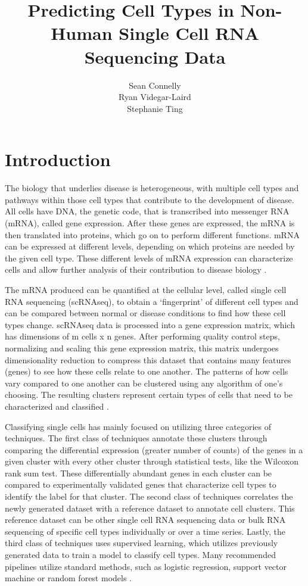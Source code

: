 \documentclass{article}
\title{Predicting Cell Types in Non-Human Single Cell RNA Sequencing Data}
\author{
  Sean Connelly \\
  \And
  Ryan Videgar-Laird \\
  \AND
  Stephanie Ting \\
}
\begin{document}
\maketitle

\section{Introduction}

The biology that underlies disease is heterogeneous, with multiple cell types and pathways within those cell types that contribute to the development of disease. All cells have DNA, the genetic code, that is transcribed into messenger RNA (mRNA), called gene expression. After these genes are expressed, the mRNA is then translated into proteins, which go on to perform different functions. mRNA can be expressed at different levels, depending on which proteins are needed by the given cell type. These different levels of mRNA expression can characterize cells and allow further analysis of their contribution to disease biology \cite{segundo-valIntroductionGeneExpression2016}.
 
 The mRNA produced can be quantified at the cellular level, called single cell RNA sequencing (scRNAseq), to obtain a ‘fingerprint’ of different cell types and can be compared between normal or disease conditions to find how these cell types change. scRNAseq data is processed into a gene expression matrix, which has dimensions of m cells x n genes. After performing quality control steps, normalizing and scaling this gene expression matrix, this matrix undergoes dimensionality reduction to compress this dataset that contains many features (genes) to see how these cells relate to one another. The patterns of how cells vary compared to one another can be clustered using any algorithm of one’s choosing. The resulting clusters represent certain types of cells that need to be characterized and classified \cite{aljanahiIntroductionAnalysisSingleCell2018}.

Classifying single cells has mainly focused on utilizing three categories of techniques. The first class of techniques annotate these clusters through comparing the differential expression (greater number of counts) of the genes in a given cluster with every other cluster through statistical tests, like the Wilcoxon rank sum test. These differentially abundant genes in each cluster can be compared to experimentally validated genes that characterize cell types to identify the label for that cluster. The second class of techniques correlates the newly generated dataset with a reference dataset to annotate cell clusters. This reference dataset can be other single cell RNA sequencing data or bulk RNA sequencing of specific cell types individually or over a time series. Lastly, the third class of techniques uses supervised learning, which utilizes previously generated data to train a model to classify cell types. Many recommended pipelines utilize standard methods, such as logistic regression, support vector machine or random forest models \cite{heumosBestPracticesSinglecell2023}.
\end{document}
